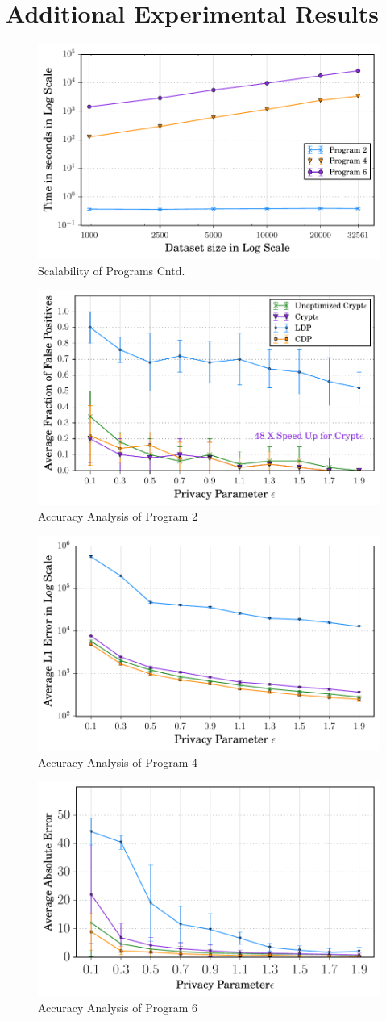 \section{Additional Experimental Results}
\begin{figure}
     \includegraphics[width=0.5\linewidth]{scale2.pdf}
        \caption{Scalability of \system Programs Cntd.}\label{scale}
    \end{figure}
    \begin{figure}
     \includegraphics[width=0.5\linewidth]{2_final.pdf}
        \caption{Accuracy Analysis of \system Program 2 }\label{scale}
    \end{figure}
    \begin{figure}
     \includegraphics[width=0.5\linewidth]{4_final.pdf}
        \caption{Accuracy Analysis of \system Program 4 }\label{scale}
    \end{figure}
    \begin{figure}
     \includegraphics[width=0.5\linewidth]{6_finals.pdf}
        \caption{Accuracy Analysis of \system Program 6 }\label{scale}
    \end{figure}
